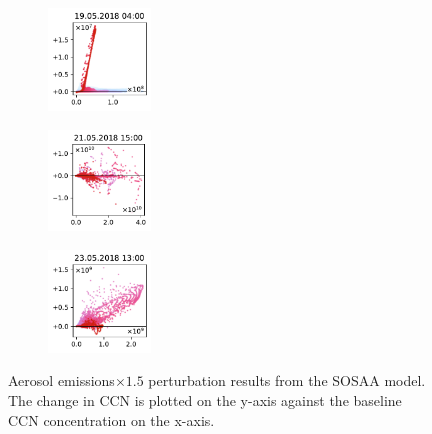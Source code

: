 \begin{figure}[H]
    \begin{subfigure}
        \centering
        \includegraphics[width=0.30\textwidth,valign=t]{evaluation/figures/perturbations/perturbation-19.05.2018:04.00-aerosols-mul-1.5.pdf}
    \end{subfigure}
    \begin{subfigure}
        \centering
        \includegraphics[width=0.30\textwidth,valign=t]{evaluation/figures/perturbations/perturbation-21.05.2018:15.00-aerosols-mul-1.5.pdf}
    \end{subfigure}
    \begin{subfigure}
        \centering
        \includegraphics[width=0.30\textwidth,valign=t]{evaluation/figures/perturbations/perturbation-23.05.2018:13.00-aerosols-mul-1.5.pdf}
    \end{subfigure}

    \caption[Aerosol emissions$\times 1.5$ perturbation SOSAA results]{Aerosol emissions$\times 1.5$ perturbation results from the SOSAA model. The change in CCN is plotted on the y-axis against the baseline CCN concentration on the x-axis.}
    \label{fig:sosaa-perturbation-aerosols-mul-1.5}
\end{figure}

